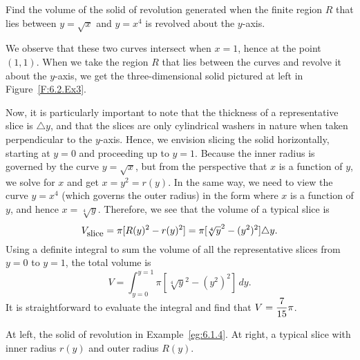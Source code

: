 \begin{example} \label{eg:6.1.4} %
Find the volume of the solid of revolution generated when the finite region $R$ that lies between $y = \sqrt{x}$ and $y = x^4$ is revolved about the $y$-axis.

\solution
We observe that these two curves intersect when $x = 1$, hence at the point $(1,1)$.  When we take the region $R$ that lies between the curves and revolve it about the $y$-axis, we get the three-dimensional solid pictured at left in Figure~\ref{F:6.2.Ex3}.

Now, it is particularly important to note that the thickness of a representative slice is $\triangle y$, and that the slices are only cylindrical washers in nature when taken perpendicular to the $y$-axis.  Hence, we envision slicing the solid horizontally, starting at $y = 0$ and proceeding up to $y = 1$.  Because the inner radius is governed by the curve $y = \sqrt{x}$, but from the perspective that $x$ is a function of $y$, we solve for $x$ and get $x = y^2 = r(y)$.  In the same way, we need to view the curve $y = x^4$ (which governs the outer radius) in the form where $x$ is a function of $y$, and hence $x = \sqrt[4]{y}$.  Therefore, we see that the volume of a typical slice is 
$$V_{\mbox{\small{slice}}} = \pi [R(y)^2 - r(y)^2] = \pi[\sqrt[4]{y}^2 - (y^2)^2] \triangle y.$$
Using a definite integral to sum the volume of all the representative slices from $y = 0$ to $y = 1$, the total volume is
$$V = \int_{y=0}^{y=1} \pi \left[ \sqrt[4]{y}^2 - (y^2)^2 \right] \, dy.$$
It is straightforward to evaluate the integral and find that $\displaystyle V = \frac{7}{15} \pi$.
\end{example}

\begin{marginfigure}[-12cm] %
\caption{At left, the solid of revolution in Example~\ref{eg:6.1.4}.  At right, a typical slice with inner radius $r(y)$ and outer radius $R(y)$.} \label{F:6.2.Ex3}
\end{marginfigure}

